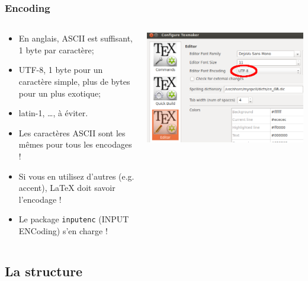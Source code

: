 \documentclass[10pt,svgnames,usenames,table]{beamer} %
\begin{document}
\begin{frame}[fragile]
  \frametitle{Encoding}
  \begin{columns}
    \begin{column}{0.5\textwidth}
      \begin{itemize}
        \item En anglais, ASCII est suffisant, 1 byte par caractère;
        \item UTF-8, 1 byte pour un caractère simple, plus de bytes pour un plus exotique;
        \item latin-1, \dots, à éviter.
        \item Les caractères ASCII sont les mêmes pour tous les encodages !
        \item Si vous en utilisez d'autres (e.g. accent), \LaTeX{} doit savoir l'encodage !
        \item Le package \lstinline|inputenc| (INPUT ENCoding) s'en charge !
      \end{itemize}
    \end{column}
    \begin{column}{0.5\textwidth}
      \centering
      \includegraphics[width=\linewidth]{img/utf8_circle.png}
    \end{column}
  \end{columns}
\end{frame}

\subsection{La structure}
\end{document}
